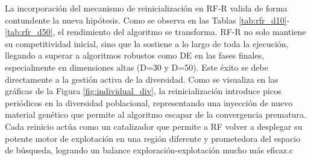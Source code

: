 \documentclass[11pt,a4paper]{article}
\begin{document}
La incorporación del mecanismo de reinicialización en RF-R valida de forma contundente la nueva hipótesis. Como se observa en las Tablas \ref{tab:rfr_d10}-\ref{tab:rfr_d50}, el rendimiento del algoritmo se transforma. RF-R no solo mantiene su competitividad inicial, sino que la sostiene a lo largo de toda la ejecución, llegando a superar a algoritmos robustos como DE en las fases finales, especialmente en dimensiones altas (D=30 y D=50). Este éxito se debe directamente a la gestión activa de la diversidad. Como se visualiza en las gráficas de la Figura \ref{fig:individual_div}, la reinicialización introduce picos periódicos en la diversidad poblacional, representando una inyección de nuevo material genético que permite al algoritmo escapar de la convergencia prematura. Cada reinicio actúa como un catalizador que permite a RF volver a desplegar su potente motor de explotación en una región diferente y prometedora del espacio de búsqueda, logrando un balance exploración-explotación mucho más eficaz.c
\end{document}
